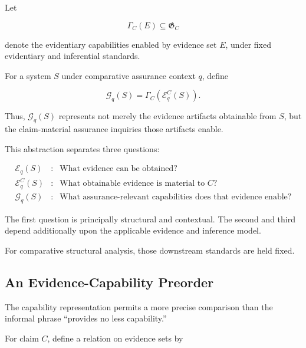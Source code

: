 Let

\begin{equation}
  \Gamma_C(E)
  \subseteq
  \mathfrak{G}_C
  \label{eq:evidence-capability-map}
\end{equation}

denote the evidentiary capabilities enabled by evidence set \(E\),
under fixed evidentiary and inferential standards.

For a system \(S\) under comparative assurance context \(q\), define

\begin{equation}
  \mathcal{G}_q(S)
  =
  \Gamma_C\left(
  \mathcal{E}^{C}_q(S)
  \right).
  \label{eq:system-capability-set}
\end{equation}

Thus, \(\mathcal{G}_q(S)\) represents not merely the evidence artifacts obtainable from \(S\),
but the claim-material assurance inquiries those artifacts enable.

This abstraction separates three questions:

\begin{equation}
  \boxed{
    \begin{array}{rcl}
      \mathcal{E}_q(S)
       & : &
      \text{What evidence can be obtained?}
      \\[4pt]
      \mathcal{E}^{C}_q(S)
       & : &
      \text{What obtainable evidence is material to } C\text{?}
      \\[4pt]
      \mathcal{G}_q(S)
       & : &
      \text{What assurance-relevant capabilities does that evidence enable?}
    \end{array}
  }
  \label{eq:evidence-three-levels}
\end{equation}

The first question is principally structural and contextual.
The second and third depend additionally upon the applicable evidence and inference model.

For comparative structural analysis, those downstream standards are held fixed.

\subsection{An Evidence-Capability Preorder}
\label{aa.subsec.evidence-preorder}

The capability representation permits a more precise comparison than the informal phrase ``provides no less capability.''

For claim \(C\), define a relation on evidence sets by

